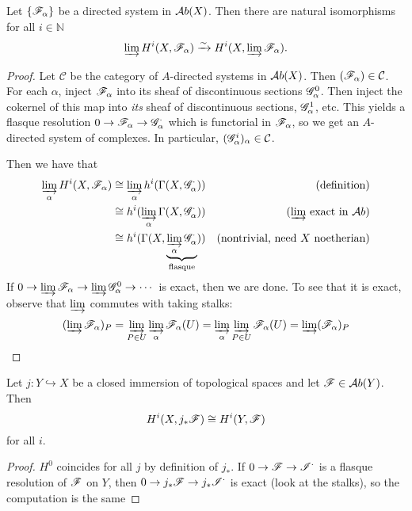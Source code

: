 \begin{lemma} \label{L:CohomologyLimit}
Let $\{\mathscr{F}_{\alpha}\}$ be a directed system in $\mathcal{A}b(X)$.  Then
there are natural isomorphisms for all $i\in \mathbb{N}$
\[
 \varinjlim H^i(X,\mathscr{F}_{\alpha}) \xrightarrow{\sim} H^i(X,\varinjlim
 \mathscr{F}_{\alpha}).
\]
\end{lemma}
\begin{proof}
Let $\mathcal{C}$ be the category of $A$-directed systems in
$\mathcal{A}b(X)$.  Then $(\mathscr{F}_{\alpha})\in \mathcal{C}$.  For each
$\alpha$, inject $\mathscr{F}_{\alpha}$ into its sheaf of discontinuous
sections $\mathscr{G}^0_{\alpha}$.  Then inject the cokernel of this map
into \emph{its} sheaf of discontinuous sections, $\mathscr{G}^1_{\alpha}$,
etc. This yields a flasque resolution $0\to \mathscr{F}_{\alpha} \to
\mathscr{G}^{\cdot}_{\alpha}$ which is functorial in $\mathscr{F}_{\alpha}$, so we
get an $A$-directed system of complexes.  In particular,
$(\mathscr{G}^i_{\alpha})_{\alpha}\in \mathcal{C}$.

Then we have that \begin{align*}
 \varinjlim_{\alpha} H^i(X,\mathscr{F}_{\alpha}) &\cong \varinjlim_{\alpha}
 h^i(\Gamma(X,\mathscr{G}^{\cdot}_{\alpha})) & \text{(definition)} \\
  &\cong h^i(\varinjlim_{\alpha} \Gamma(X,\mathscr{G}^{\cdot}_{\alpha})) & \text{($\varinjlim$ exact in
  $\mathcal{A}b$)}\\
  &\cong h^i(\Gamma(X,\underbrace{\varinjlim_{\alpha} \mathscr{G}^{\cdot}_{\alpha}}_{\text{flasque}})) &
  \text{(nontrivial, need $X$ noetherian)}
\end{align*}
If $0\to \varinjlim \mathscr{F}_{\alpha} \to \varinjlim \mathscr{G}^0_{\alpha} \to
\cdots$ is exact, then we are done.  To see that it is exact,
observe that $\varinjlim$ commutes with taking stalks:
\[
    (\varinjlim \mathscr{F}_{\alpha})_P = \varinjlim_{P\in U}
    \varinjlim_{\alpha} \mathscr{F}_{\alpha}(U) = \varinjlim_{\alpha}
    \varinjlim_{P\in U} \mathscr{F}_{\alpha}(U) = \varinjlim
    (\mathscr{F}_{\alpha})_P
\]
\end{proof}

\begin{lemma} \label{L:ClosedImmersion}
Let $j:Y\hookrightarrow X$ be a closed immersion of topological
spaces and let $\mathscr{F}\in \mathcal{A}b(Y)$.  Then
\[
    H^i(X,j_*\mathscr{F})\cong H^i(Y,\mathscr{F})
\]
for all $i$.
\end{lemma}
\begin{proof}
$H^0$ coincides for all $j$ by definition of $j_*$.  If $0\to \mathscr{F}
\to \mathscr{I}^{\cdot}$ is a flasque resolution of $\mathscr{F}$ on $Y$, then $0\to
j_*\mathscr{F} \to j_*\mathscr{I}^{\cdot}$ is exact (look at the stalks), so the
computation is the same
\end{proof}

